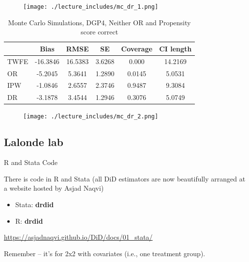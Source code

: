 \documentclass{beamer}
\begin{document}
\begin{frame}[plain]
	\begin{figure}
	\texttt{[image: ./lecture\_includes/mc\_dr\_1.png]}
	\end{figure}

\end{frame}


\begin{frame}[plain]

\begin{table}[htbp]\centering
\scriptsize
\caption{Monte Carlo Simulations, DGP4, Neither OR and Propensity score correct}
\centering
\begin{threeparttable}
\begin{tabular}{l*{5}{c}}
\toprule
\multicolumn{1}{l}{\textbf{}}&
\multicolumn{1}{c}{\textbf{Bias}}&
\multicolumn{1}{c}{\textbf{RMSE}}&
\multicolumn{1}{c}{\textbf{SE}}&
\multicolumn{1}{c}{\textbf{Coverage}}&
\multicolumn{1}{c}{\textbf{CI length}}\\
\midrule
TWFE & -16.3846 & 16.5383 & 3.6268 & 0.000 & 14.2169 \\
OR & -5.2045 & 5.3641 & 1.2890 & 0.0145 & 5.0531 \\
IPW & -1.0846 & 2.6557 & 2.3746 & 0.9487 & 9.3084 \\
DR & -3.1878 & 3.4544 & 1.2946 & 0.3076 & 5.0749 \\
\bottomrule
\end{tabular}
\end{threeparttable}
\end{table}

\end{frame}

\begin{frame}[plain]
	\begin{figure}
	\texttt{[image: ./lecture\_includes/mc\_dr\_2.png]}
	\end{figure}


\end{frame}

\subsection{Lalonde lab}

\begin{frame}{R and Stata Code}

There is code in R and Stata (all DiD estimators are now beautifully arranged at a website hosted by Asjad Naqvi)
\begin{itemize}
\item Stata: \textbf{drdid}
\item R: \textbf{drdid}
\end{itemize}

\bigskip

\url{https://asjadnaqvi.github.io/DiD/docs/01_stata/}

\bigskip

Remember -- it's for 2x2 with covariates (i.e., one treatment group). 

\end{frame}
\end{document}

